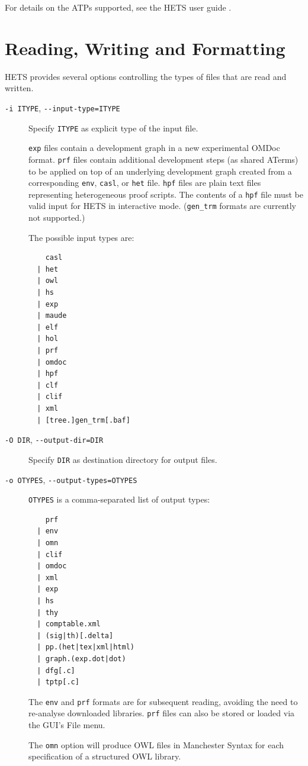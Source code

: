 \documentclass{article}
\newcommand{\normalTEXTSC}[2]{{#1\scriptsize#2}}
\newcommand     {\Hets}{\normalTEXTSC{H}{ETS}\xspace}
\begin{document}
For details on the ATPs supported, see the \Hets user guide \cite{HetsUserGuide}.

\section{Reading, Writing and Formatting}

\Hets provides several options controlling the types of files
that are read and written.
\begin{description}
\item[\texttt{-i ITYPE}, \texttt{-{}-input-type=ITYPE}] Specify \texttt{ITYPE}
  as explicit type of the input file. 

  \texttt{exp} files contain a development graph in a new experimental OMDoc
  format.  \texttt{prf} files contain additional development steps (as shared
  ATerms) to be applied on top of an underlying development graph created from
  a corresponding \texttt{env}, \texttt{casl}, or \texttt{het}
  file. \texttt{hpf} files are plain text files representing heterogeneous
  proof scripts. The contents of a \texttt{hpf} file must be valid input for
  \Hets in interactive mode.  (\texttt{gen\_trm} formats are currently not
  supported.)

The possible input types are:
\begin{lstlisting}
    casl
  | het
  | owl
  | hs
  | exp
  | maude
  | elf
  | hol
  | prf
  | omdoc
  | hpf
  | clf
  | clif
  | xml
  | [tree.]gen_trm[.baf]
\end{lstlisting}

\item[\texttt{-O DIR}, \texttt{-{}-output-dir=DIR}]
Specify \texttt{DIR} as destination directory for output files.

\item[\texttt{-o OTYPES}, \texttt{-{}-output-types=OTYPES}]
\texttt{OTYPES} is a comma-separated list of output types:
\begin{lstlisting}
    prf
  | env
  | omn
  | clif
  | omdoc
  | xml
  | exp
  | hs
  | thy
  | comptable.xml
  | (sig|th)[.delta]
  | pp.(het|tex|xml|html)
  | graph.(exp.dot|dot)
  | dfg[.c]
  | tptp[.c]
\end{lstlisting}
The \texttt{env} and \texttt{prf} formats are for subsequent reading,
avoiding the need to re-analyse downloaded libraries. \texttt{prf} files
can also be stored or loaded via the GUI's File menu.

The \texttt{omn} option \cite{w3c:owl2-manchester} will produce OWL files in
Manchester Syntax for each specification of a structured OWL library.


\end{description}
\end{document}
